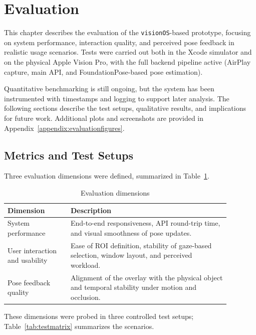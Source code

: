 \section{Evaluation}
\label{sec:evaluation}

This chapter describes the evaluation of the \texttt{visionOS}-based prototype, focusing on system performance, interaction quality, and perceived pose feedback in realistic usage scenarios. Tests were carried out both in the Xcode simulator and on the physical Apple Vision Pro, with the full backend pipeline active (AirPlay capture, main API, and FoundationPose-based pose estimation).  

Quantitative benchmarking is still ongoing, but the system has been instrumented with timestamps and logging to support later analysis. The following sections describe the test setups, qualitative results, and implications for future work. Additional plots and screenshots are provided in Appendix~\ref{appendix:evaluationfigures}.

\subsection{Metrics and Test Setups}
\label{subsec:evaluation-metrics}

Three evaluation dimensions were defined, summarized in Table~\ref{tab:evaluation-dimensions}.

\begin{table}[H]
    \centering
    \caption{Evaluation dimensions}
    \label{tab:evaluation-dimensions}
    \begin{tabular}{p{0.25\linewidth}p{0.63\linewidth}}
        \toprule
        \textbf{Dimension} & \textbf{Description} \\
        \midrule
        System performance &
        End-to-end responsiveness, API round-trip time, and visual smoothness of pose updates. \\
        User interaction and usability &
        Ease of ROI definition, stability of gaze-based selection, window layout, and perceived workload. \\
        Pose feedback quality &
        Alignment of the overlay with the physical object and temporal stability under motion and occlusion. \\
        \bottomrule
    \end{tabular}
\end{table}

These dimensions were probed in three controlled test setups; Table~\ref{tab:testmatrix} summarizes the scenarios.

